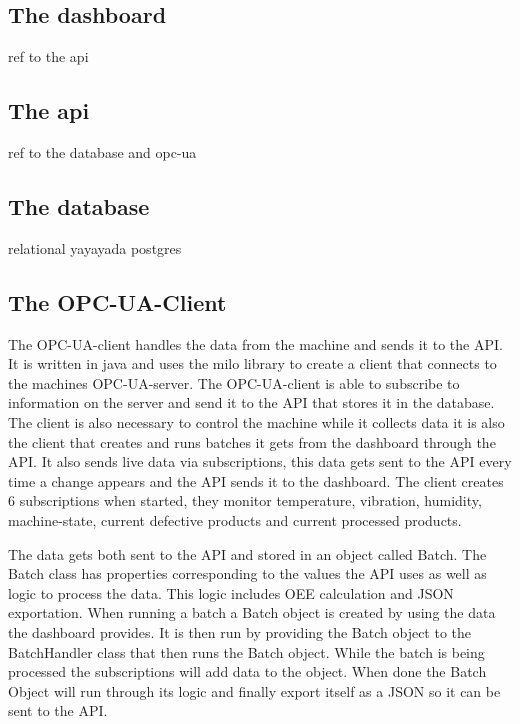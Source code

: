 \subsection{The dashboard}
ref to the api

\subsection{The api}
ref to the database and opc-ua

\subsection{The database}
relational yayayada postgres


\subsection{The OPC-UA-Client}
The OPC-UA-client handles the data from the machine and sends it to the API. It 
is written in java and uses the milo library to create a client that connects to 
the machines OPC-UA-server. The OPC-UA-client is able to subscribe to 
information on the server and send it to the API that stores it in the database. 
The client is also necessary to control the machine while it collects data it is 
also the client that creates and runs batches it gets from the dashboard through 
the API. It also sends live data via subscriptions, this data gets sent to the 
API every time a change appears and the API sends it to the dashboard. The 
client creates 6 subscriptions when started, they monitor temperature, 
vibration, humidity, machine-state,  current defective products and current 
processed products. 

The data gets both sent to the API and stored in an object called 
Batch. The Batch class  has properties corresponding 
to the values the API uses as well as logic to process the data. This logic 
includes OEE calculation and JSON exportation. When running a batch a Batch 
object is created by using the data the dashboard provides. It is then run by 
providing the Batch object to the BatchHandler class that then runs the Batch 
object. While the batch is being processed the subscriptions will add data to 
the object. When done the Batch Object will run through its logic and finally 
export itself as a JSON so it can be sent to the API. 